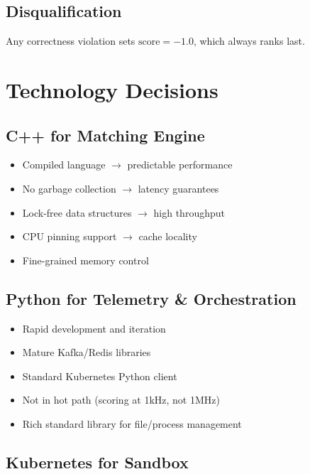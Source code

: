 \documentclass[10pt,a4paper,oneside]{report}
\begin{document}
\section{Disqualification}

Any correctness violation sets $\text{score} = -1.0$, which always ranks last.

\chapter{Technology Decisions}

\section{C++ for Matching Engine}

\begin{itemize}
    \item Compiled language $\rightarrow$ predictable performance
    \item No garbage collection $\rightarrow$ latency guarantees
    \item Lock-free data structures $\rightarrow$ high throughput
    \item CPU pinning support $\rightarrow$ cache locality
    \item Fine-grained memory control
\end{itemize}

\section{Python for Telemetry \& Orchestration}

\begin{itemize}
    \item Rapid development and iteration
    \item Mature Kafka/Redis libraries
    \item Standard Kubernetes Python client
    \item Not in hot path (scoring at 1kHz, not 1MHz)
    \item Rich standard library for file/process management
\end{itemize}

\section{Kubernetes for Sandbox}
\end{document}
